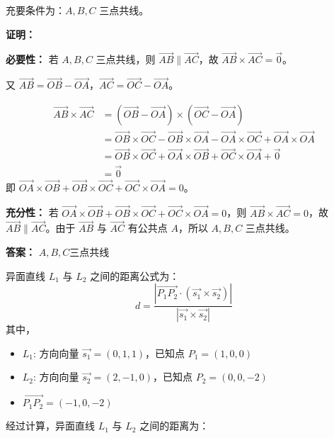\begin{solution}

充要条件为：\(A, B, C\) 三点共线。

\textbf{证明：}

\textbf{必要性：} 若 \(A, B, C\) 三点共线，则 \( \overrightarrow{AB} \parallel \overrightarrow{AC} \)，故 \( \overrightarrow{AB} \times \overrightarrow{AC} = \vec{0} \)。

又 \( \overrightarrow{AB} = \overrightarrow{OB} - \overrightarrow{OA} \)，\( \overrightarrow{AC} = \overrightarrow{OC} - \overrightarrow{OA} \)。

\[
\begin{aligned}
\overrightarrow{AB} \times \overrightarrow{AC} &= (\overrightarrow{OB} - \overrightarrow{OA}) \times (\overrightarrow{OC} - \overrightarrow{OA}) \\
&= \overrightarrow{OB} \times \overrightarrow{OC} - \overrightarrow{OB} \times \overrightarrow{OA} - \overrightarrow{OA} \times \overrightarrow{OC} + \overrightarrow{OA} \times \overrightarrow{OA} \\
&= \overrightarrow{OB} \times \overrightarrow{OC} + \overrightarrow{OA} \times \overrightarrow{OB} + \overrightarrow{OC} \times \overrightarrow{OA} + \vec{0} \\
&= \vec{0}
\end{aligned}
\]
即 \( \vec{OA}\times\vec{OB}+\vec{OB}\times\vec{OC}+\vec{OC}\times\vec{OA}=0 \)。

\textbf{充分性：} 若 \( \vec{OA}\times\vec{OB}+\vec{OB}\times\vec{OC}+\vec{OC}\times\vec{OA}=0 \)，则 \( \overrightarrow{AB} \times \overrightarrow{AC} = 0 \)，故 \( \overrightarrow{AB} \parallel \overrightarrow{AC} \)。由于 \( \overrightarrow{AB} \) 与 \( \overrightarrow{AC} \) 有公共点 \(A\)，所以 \(A, B, C\) 三点共线。

\textbf{答案：} \(A,B,C\)三点共线
\end{solution}

\begin{solution}

异面直线 \(L_{1}\) 与 \(L_{2}\) 之间的距离公式为：
\[ d = \frac{|\overrightarrow{P_{1}P_{2}} \cdot (\vec{s_{1}} \times \vec{s_{2}})|}{|\vec{s_{1}} \times \vec{s_{2}}|} \]
其中，
\begin{itemize}
    \item \(L_{1}\): 方向向量 \( \vec{s_{1}} = (0, 1, 1) \)，已知点 \( P_{1} = (1, 0, 0) \)
    \item \(L_{2}\): 方向向量 \( \vec{s_{2}} = (2, -1, 0) \)，已知点 \( P_{2} = (0, 0, -2) \)
    \item \( \overrightarrow{P_{1}P_{2}} = (-1, 0, -2) \)
\end{itemize}

经过计算，异面直线 \(L_{1}\) 与 \(L_{2}\) 之间的距离为：

\end{solution}

